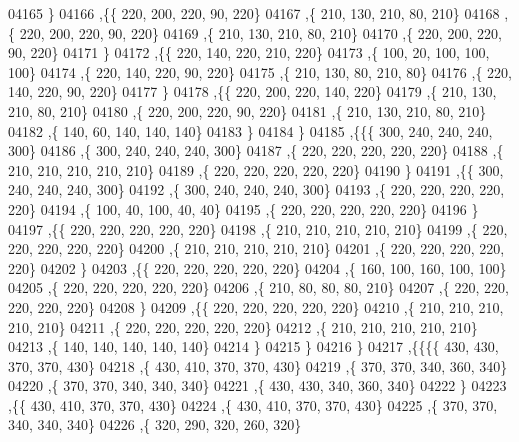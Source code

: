 \begin{DoxyCode}
04165     \}
04166    ,\{\{   220,   200,   220,    90,   220\}
04167     ,\{   210,   130,   210,    80,   210\}
04168     ,\{   220,   200,   220,    90,   220\}
04169     ,\{   210,   130,   210,    80,   210\}
04170     ,\{   220,   200,   220,    90,   220\}
04171     \}
04172    ,\{\{   220,   140,   220,   210,   220\}
04173     ,\{   100,    20,   100,   100,   100\}
04174     ,\{   220,   140,   220,    90,   220\}
04175     ,\{   210,   130,    80,   210,    80\}
04176     ,\{   220,   140,   220,    90,   220\}
04177     \}
04178    ,\{\{   220,   200,   220,   140,   220\}
04179     ,\{   210,   130,   210,    80,   210\}
04180     ,\{   220,   200,   220,    90,   220\}
04181     ,\{   210,   130,   210,    80,   210\}
04182     ,\{   140,    60,   140,   140,   140\}
04183     \}
04184    \}
04185   ,\{\{\{   300,   240,   240,   240,   300\}
04186     ,\{   300,   240,   240,   240,   300\}
04187     ,\{   220,   220,   220,   220,   220\}
04188     ,\{   210,   210,   210,   210,   210\}
04189     ,\{   220,   220,   220,   220,   220\}
04190     \}
04191    ,\{\{   300,   240,   240,   240,   300\}
04192     ,\{   300,   240,   240,   240,   300\}
04193     ,\{   220,   220,   220,   220,   220\}
04194     ,\{   100,    40,   100,    40,    40\}
04195     ,\{   220,   220,   220,   220,   220\}
04196     \}
04197    ,\{\{   220,   220,   220,   220,   220\}
04198     ,\{   210,   210,   210,   210,   210\}
04199     ,\{   220,   220,   220,   220,   220\}
04200     ,\{   210,   210,   210,   210,   210\}
04201     ,\{   220,   220,   220,   220,   220\}
04202     \}
04203    ,\{\{   220,   220,   220,   220,   220\}
04204     ,\{   160,   100,   160,   100,   100\}
04205     ,\{   220,   220,   220,   220,   220\}
04206     ,\{   210,    80,    80,    80,   210\}
04207     ,\{   220,   220,   220,   220,   220\}
04208     \}
04209    ,\{\{   220,   220,   220,   220,   220\}
04210     ,\{   210,   210,   210,   210,   210\}
04211     ,\{   220,   220,   220,   220,   220\}
04212     ,\{   210,   210,   210,   210,   210\}
04213     ,\{   140,   140,   140,   140,   140\}
04214     \}
04215    \}
04216   \}
04217  ,\{\{\{\{   430,   430,   370,   370,   430\}
04218     ,\{   430,   410,   370,   370,   430\}
04219     ,\{   370,   370,   340,   360,   340\}
04220     ,\{   370,   370,   340,   340,   340\}
04221     ,\{   430,   430,   340,   360,   340\}
04222     \}
04223    ,\{\{   430,   410,   370,   370,   430\}
04224     ,\{   430,   410,   370,   370,   430\}
04225     ,\{   370,   370,   340,   340,   340\}
04226     ,\{   320,   290,   320,   260,   320\}

\end{DoxyCode}
